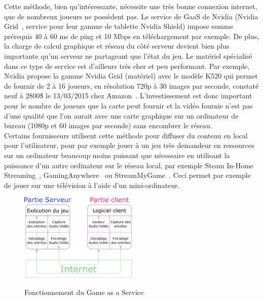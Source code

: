 Cette méthode, bien qu'intéressante, nécessite une très bonne connexion internet, que de nombreux joueurs ne possèdent pas. Le service de GaaS de Nvidia (Nvidia Grid~\cite{grid}, service pour leur gamme de tablette Nvidia Shield) impose comme prérequis 40 à 60 ms de ping et 10 Mbps en téléchargement par exemple. De plus, la charge de calcul graphique et réseau du côté serveur devient bien plus importante qu'un serveur ne partageant que l'état du jeu. Le matériel spécialisé dans ce type de service est d'ailleurs très cher et peu performant. Par exemple, Nvidia propose la gamme Nvidia Grid (matériel) avec le modèle K520 qui permet de fournir de 2 à 16 joueurs, en résolution 720p à 30 images par seconde, constaté neuf à 2800\$ le 13/03/2015 chez Amazon~\cite{grid_k520}. L'investissement est donc important pour le nombre de joueurs que la carte peut fournir et la vidéo fournie n'est pas d'une qualité que l'on aurait avec une carte graphique sur un ordinateur de bureau (1080p et 60 images par seconde) sans encombrer le réseau.\\

Certains fournisseurs utilisent cette méthode pour diffuser du contenu en local pour l'utilisateur, pour par exemple jouer à un jeu très demandeur en ressources sur un ordinateur beaucoup moins puissant que nécessaire en utilisant la puissance d'un autre ordinateur sur le réseau local, par exemple Steam In-Home Streaming~\cite{steam_inhome}, GamingAnywhere~\cite{gaminganywhere_article} ou StreamMyGame~\cite{streammygame}. Ceci permet par exemple de jouer sur une télévision à l'aide d'un mini-ordinateur.

\begin{figure}[t!]
	\centering
	\includegraphics[width=0.5\textwidth]{gaas.png}
	\\[0.2cm]
	\caption{Fonctionnement du Game as a Service}
	\label{fig:gaas}
\end{figure}
